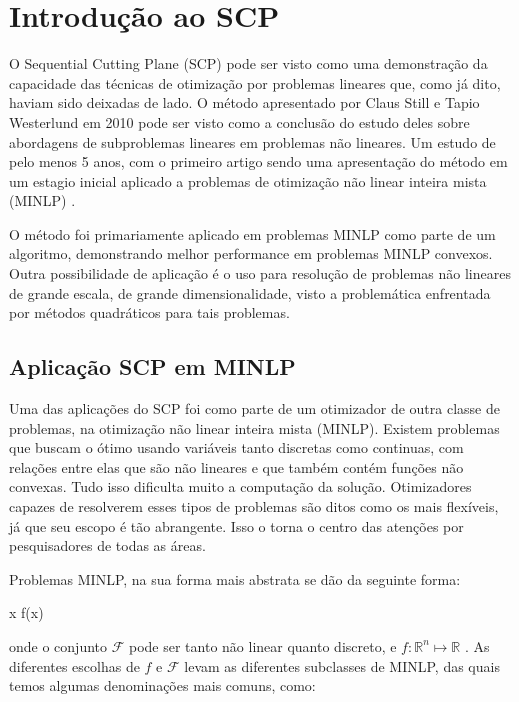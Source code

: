 \section{Introdução ao SCP}

\noindent
O Sequential Cutting Plane (SCP) \cite{Still2010} pode ser visto como uma demonstração da
capacidade das técnicas de otimização por problemas lineares que, como já dito, haviam
sido deixadas de lado. O método apresentado por Claus Still e Tapio Westerlund em 2010
pode ser visto como a conclusão do estudo deles sobre abordagens de subproblemas lineares
em problemas não lineares. Um estudo de pelo menos 5 anos, com o primeiro artigo sendo
uma apresentação do método em um estagio inicial aplicado a problemas de otimização
não linear inteira mista (MINLP) \cite{Still_2005}.

O método foi primariamente aplicado em problemas MINLP como parte de um algoritmo,
demonstrando melhor performance em problemas MINLP convexos. Outra possibilidade de
aplicação é o uso para resolução de problemas não lineares de grande escala, de grande
dimensionalidade, visto a problemática enfrentada por métodos quadráticos para tais
problemas.

\subsection{Aplicação SCP em MINLP}

\noindent
Uma das aplicações do SCP foi como parte de um otimizador de outra classe de problemas, na
otimização não linear inteira mista (MINLP). Existem problemas que buscam o ótimo usando
variáveis tanto discretas como continuas, com relações entre elas que são não lineares e
que também contém funções não convexas. Tudo isso dificulta muito a computação da solução.
Otimizadores capazes de resolverem esses tipos de problemas são ditos como os mais flexíveis,
já que seu escopo é tão abrangente. Isso o torna o centro das atenções por pesquisadores de
todas as áreas.

Problemas MINLP, na sua forma mais abstrata se dão da seguinte forma:

\vspace{-15pt}
\begin{mini!}
{x}{ f(x) \label{minlp_obj}}{\label{prob_minlp}}{}
\end{mini!}
onde o conjunto \( \mathcal{F} \) pode ser tanto não linear quanto discreto, e \( f: \mathbb{R}^n \mapsto \mathbb{R}\) .
As diferentes escolhas
de \(f\) e \(\mathcal{F}\) levam as diferentes subclasses de MINLP, das quais temos algumas
denominações mais comuns, como:

